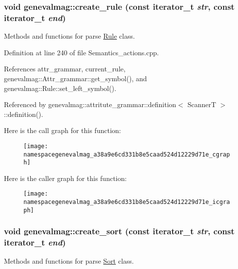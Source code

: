 \hypertarget{namespacegenevalmag_a38a9e6cd331b8e5caad524d12229d71e}{
\subsubsection[{create\_\-rule}]{\setlength{\rightskip}{0pt plus 5cm}void genevalmag::create\_\-rule (const iterator\_\-t {\em str}, \/  const iterator\_\-t {\em end})}}
\label{namespacegenevalmag_a38a9e6cd331b8e5caad524d12229d71e}
Methods and functions for parse \hyperlink{classgenevalmag_1_1Rule}{Rule} class. 

Definition at line 240 of file Semantics\_\-actions.cpp.



References attr\_\-grammar, current\_\-rule, genevalmag::Attr\_\-grammar::get\_\-symbol(), and genevalmag::Rule::set\_\-left\_\-symbol().



Referenced by genevalmag::attritute\_\-grammar::definition$<$ ScannerT $>$::definition().



Here is the call graph for this function:\nopagebreak
\begin{figure}[H]
\begin{center}
\leavevmode
\texttt{[image: namespacegenevalmag\_a38a9e6cd331b8e5caad524d12229d71e\_cgraph]}
\end{center}
\end{figure}




Here is the caller graph for this function:\nopagebreak
\begin{figure}[H]
\begin{center}
\leavevmode
\texttt{[image: namespacegenevalmag\_a38a9e6cd331b8e5caad524d12229d71e\_icgraph]}
\end{center}
\end{figure}


\hypertarget{namespacegenevalmag_a8fe47e97e9f000f1eb35ee9e86b2a5c0}{
\subsubsection[{create\_\-sort}]{\setlength{\rightskip}{0pt plus 5cm}void genevalmag::create\_\-sort (const iterator\_\-t {\em str}, \/  const iterator\_\-t {\em end})}}
\label{namespacegenevalmag_a8fe47e97e9f000f1eb35ee9e86b2a5c0}
Methods and functions for parse \hyperlink{classgenevalmag_1_1Sort}{Sort} class. 

